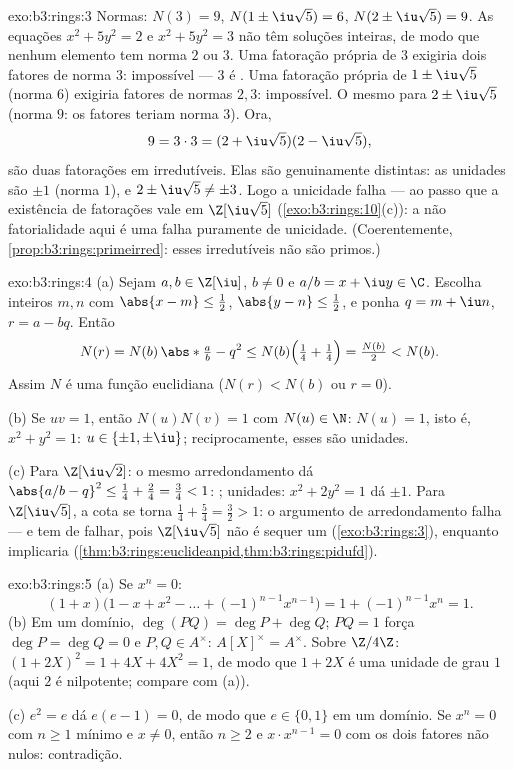\begin{solution}{exo:b3:rings:3}
Normas: $N(3) = 9$, $N(1 \pm \iu\sqrt5) = 6$, $N(2 \pm \iu\sqrt5) =
9$. As equações $x^2 + 5y^2 = 2$ e $x^2 + 5y^2 = 3$ não têm soluções
inteiras, de modo que nenhum elemento tem norma $2$ ou $3$. Uma
fatoração própria de $3$ exigiria dois fatores de norma $3$:
impossível --- $3$ é . Uma fatoração própria de $1
\pm \iu\sqrt5$ (norma
$6$) exigiria fatores de normas $2, 3$: impossível. O mesmo para
$2 \pm \iu\sqrt5$ (norma $9$: os fatores teriam norma $3$). Ora,
\[
9 = 3 \cdot 3 = (2 + \iu\sqrt5)(2 - \iu\sqrt5),
\]
são duas fatorações em irredutíveis. Elas são genuinamente distintas:
as unidades são $\pm 1$ (norma $1$), e $2 \pm \iu\sqrt5
\neq \pm 3$. Logo a unicidade
falha --- ao passo que a existência de fatorações vale em $\Z[\iu\sqrt5]$
(\cref{exo:b3:rings:10}(c)): a não fatorialidade aqui é uma falha puramente de
unicidade. (Coerentemente, \cref{prop:b3:rings:primeirred}: esses irredutíveis não são
primos.)
\end{solution}

\begin{solution}{exo:b3:rings:4}
(a) Sejam $a, b \in \Z[\iu]$, $b \neq 0$ e $a/b = x + \iu y \in
\C$. Escolha inteiros $m, n$ com $\abs{x - m} \leq \frac12$, $\abs{y - n} \leq \frac12$, e
ponha $q = m + \iu n$, $r = a - bq$. Então
\[
N(r) = N(b)\,\abs*{\tfrac ab - q}^2
\leq N(b)\Bigl(\tfrac14 + \tfrac14\Bigr) = \tfrac{N(b)}2 < N(b).
\]
Assim $N$ é uma função euclidiana ($N(r) < N(b)$ ou $r = 0$).

(b) Se $uv = 1$, então $N(u)N(v) = 1$ com $N(u) \in \N$: $N(u) =
1$, isto é, $x^2 + y^2 = 1$: $u \in \{\pm 1, \pm\iu\}$;
reciprocamente, esses são unidades.

(c) Para $\Z[\iu\sqrt2]$: o mesmo arredondamento dá $\abs{a/b - q}^2
\leq \frac14 + \frac{2}4 = \frac34 < 1$: ; unidades:
$x^2 +
2y^2 = 1$ dá $\pm 1$. Para $\Z[\iu\sqrt5]$, a cota se torna $\frac14 + \frac54 = \frac32 > 1$: o argumento de
arredondamento falha --- e tem de falhar, pois $\Z[\iu\sqrt5]$ não é sequer um 
(\cref{exo:b3:rings:3}), enquanto  implicaria 
(\cref{thm:b3:rings:euclideanpid,thm:b3:rings:pidufd}).
\end{solution}

\begin{solution}{exo:b3:rings:5}
(a) Se $x^n = 0$:
\[
(1 + x)\bigl(1 - x + x^2 - \dots + (-1)^{n-1}x^{n-1}\bigr)
= 1 + (-1)^{n-1}x^n = 1 .
\]
(b) Em um domínio, $\deg(PQ) = \deg P + \deg Q$; $PQ = 1$ força $\deg P = \deg Q = 0$ e $P, Q \in A^\times$: $A[X]^\times =
A^\times$. Sobre
$\Z/4\Z$: $(1 + 2X)^2 = 1 + 4X + 4X^2 = 1$, de modo que $1
+ 2X$ é uma unidade de grau
$1$ (aqui $2$ é nilpotente; compare com (a)).

(c) $e^2 = e$ dá $e(e - 1) = 0$, de modo que $e \in \{0, 1\}$ em um domínio. Se $x^n = 0$ com $n \geq 1$
mínimo e $x \ne 0$, então $n \geq 2$ e $x \cdot x^{n-1} = 0$ com os dois fatores não nulos:
contradição.
\end{solution}

